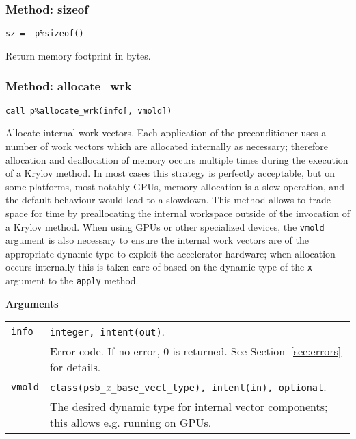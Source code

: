 \subsubsection{Method: sizeof}

\begin{center}
\verb|sz =  p%sizeof()|\\
\end{center}

\noindent
Return memory footprint in bytes.

\subsubsection{Method: allocate\_wrk}

\begin{center}
\verb|call p%allocate_wrk(info[, vmold])|\\
\end{center}

\noindent
Allocate internal work vectors. Each application of the preconditioner
uses a number of  work vectors which are allocated internally as
necessary; therefore allocation and deallocation of memory occurs
multiple times during the execution of a Krylov method. In most cases
this strategy is perfectly acceptable, but
on some platforms, most notably GPUs, memory allocation is
a slow  operation, and the default behaviour would lead to a
slowdown.  This method allows to trade space for time by preallocating
the internal workspace outside of the invocation of a Krylov
method. When using GPUs or other specialized devices, the \verb|vmold|
argument is also necessary to ensure the internal work vectors are of
the appropriate dynamic type to exploit the accelerator hardware; when
allocation occurs internally this is taken care of based on the dynamic
type of the \verb|x| argument to the \verb|apply| method.

{\baselineskip\noindent\large\bfseries Arguments} \smallskip

\begin{tabular}{p{1.2cm}p{12cm}}
\verb|info|   & \verb|integer, intent(out)|.\\
              & Error code. If no error, 0 is returned. See Section~\ref{sec:errors} for details.\\
  \verb|vmold| & \verb|class(psb_|\emph{x}\verb|_base_vect_type), intent(in), optional|. \\
  & The desired dynamic type for internal vector
  components; this allows e.g. running on GPUs. \\
\end{tabular}



